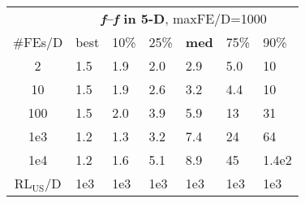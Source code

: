 \begin{tabular}{c|llllll}
 & \multicolumn{6}{|c}{\textbf{\textit{f}\raisebox{-0.35ex}{1}--\textit{f}\raisebox{-0.35ex}{24} in 5-D}, maxFE/D=1000}\\
\#FEs/D & best & 10\% & 25\% & \textbf{med} & 75\% & 90\%\\
2 & \hspace*{1ex}1.5 & \hspace*{1ex}1.9 & \hspace*{1ex}2.0 & \hspace*{1ex}2.9 & \hspace*{1ex}5.0 & 10\\
10 & \hspace*{1ex}1.5 & \hspace*{1ex}1.9 & \hspace*{1ex}2.6 & \hspace*{1ex}3.2 & \hspace*{1ex}4.4 & 10\\
100 & \hspace*{1ex}1.5 & \hspace*{1ex}2.0 & \hspace*{1ex}3.9 & \hspace*{1ex}5.9 & 13 & 31\\
1e3 & \hspace*{1ex}1.2 & \hspace*{1ex}1.3 & \hspace*{1ex}3.2 & \hspace*{1ex}7.4 & 24 & 64\\
1e4 & \hspace*{1ex}1.2 & \hspace*{1ex}1.6 & \hspace*{1ex}5.1 & \hspace*{1ex}8.9 & 45 & 1.4e2\\
$\text{RL}_{\text{US}}$/D & 1e3 & 1e3 & 1e3 & 1e3 & 1e3 & 1e3
\end{tabular}
